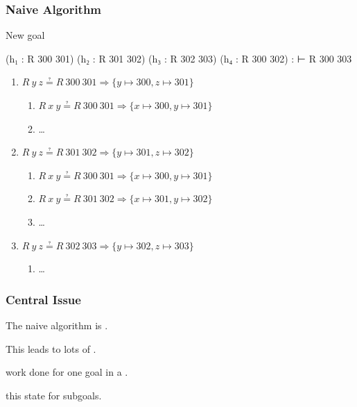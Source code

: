 \begin{frame}[fragile]
  \frametitle{Naive Algorithm}

  \begin{block}{New goal}
    \begin{leancode}
        (h₁ : R 300 301)
        (h₂ : R 301 302)
        (h₃ : R 302 303)
        (h₄ : R 300 302) :
        ⊢ R 300 303
    \end{leancode}
  \end{block}
\end{frame}

\begin{frame}
  \begin{enumerate}[<+->]
    \item $R~y~z ≟ R~300~301 ⇒ \{y ↦ 300, z ↦ 301\}$ \good
          \begin{enumerate}[<+->]
            \item $R~x~y ≟ R~300~301 ⇒ \{x ↦ 300, y ↦ 301\}$ \bad
            \item \dots
          \end{enumerate}
    \item $R~y~z ≟ R~301~302 ⇒ \{y ↦ 301, z ↦ 302\}$ \good
          \begin{enumerate}[<+->]
            \item $R~x~y ≟ R~300~301 ⇒ \{x ↦ 300, y ↦ 301\}$ 
            \item $R~x~y ≟ R~301~302 ⇒ \{x ↦ 301, y ↦ 302\}$ \bad
            \item \dots
          \end{enumerate}
    \item $R~y~z ≟ R~302~303 ⇒ \{y ↦ 302, z ↦ 303\}$ \good
          \begin{enumerate}
            \item \dots
          \end{enumerate}
  \end{enumerate}
\end{frame}

\begin{frame}
  \frametitle{Central Issue}

  The naive algorithm is .

  This leads to lots of .

  \pause


   work done for one goal in a .

   this state for subgoals.
\end{frame}

